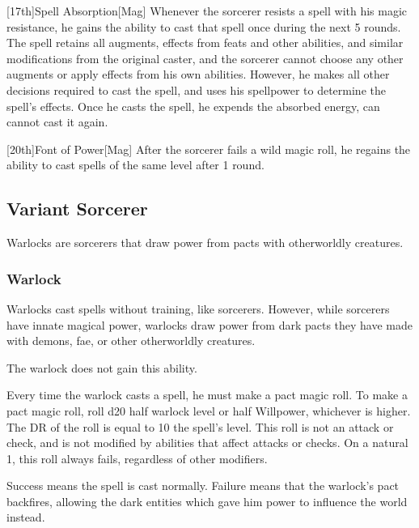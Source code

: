        [17th]{Spell Absorption}[Mag]
        Whenever the sorcerer resists a spell with his magic resistance, he gains the ability to cast that spell once during the next 5 rounds.
        The spell retains all augments, effects from feats and other abilities, and similar modifications from the original caster, and the sorcerer cannot choose any other augments or apply effects from his own abilities.
        However, he makes all other decisions required to cast the spell, and uses his spellpower to determine the spell's effects.
        Once he casts the spell, he expends the absorbed energy, can cannot cast it again.

        [20th]{Font of Power}[Mag]
        After the sorcerer fails a wild magic roll, he regains the ability to cast spells of the same level after 1 round.

    \subsection{Variant Sorcerer}

        Warlocks are sorcerers that draw power from pacts with otherworldly creatures.

        \subsubsection{Warlock}

            Warlocks cast spells without training, like sorcerers.
            However, while sorcerers have innate magical power, warlocks draw power from dark pacts they have made with demons, fae, or other otherworldly creatures.

             The warlock does not gain this ability.

             Every time the warlock casts a spell, he must make a pact magic roll.
            To make a pact magic roll, roll d20 \add half warlock level or half Willpower, whichever is higher.
            The DR of the roll is equal to 10 \add the spell's level.
            This roll is not an attack or check, and is not modified by abilities that affect attacks or checks.
            On a natural 1, this roll always fails, regardless of other modifiers.

            Success means the spell is cast normally.
            Failure means that the warlock's pact backfires, allowing the dark entities which gave him power to influence the world instead.

